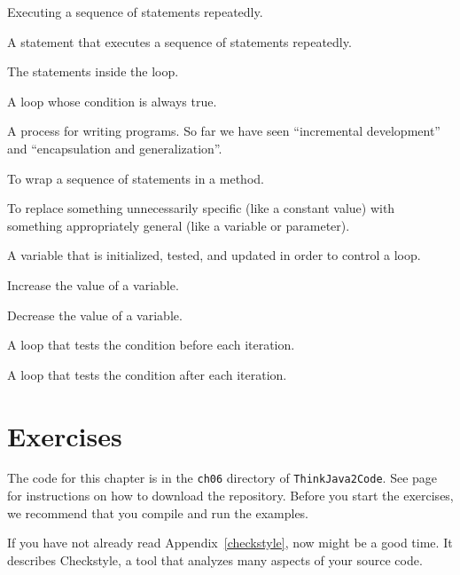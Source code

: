 \begin{description}

Executing a sequence of statements repeatedly.

A statement that executes a sequence of statements repeatedly.

The statements inside the loop.

A loop whose condition is always true.

A process for writing programs.
So far we have seen ``incremental development'' and ``encapsulation and generalization''.

To wrap a sequence of statements in a method.

To replace something unnecessarily specific (like a constant value) with something appropriately general (like a variable or parameter).

A variable that is initialized, tested, and updated in order to control a loop.

Increase the value of a variable.

Decrease the value of a variable.

A loop that tests the condition before each iteration.

A loop that tests the condition after each iteration.

\end{description}


\section{Exercises}

The code for this chapter is in the {\tt ch06} directory of {\tt ThinkJava2Code}.
See page~\pageref{code} for instructions on how to download the repository.
Before you start the exercises, we recommend that you compile and run the examples.

If you have not already read Appendix~\ref{checkstyle}, now might be a good time.
It describes Checkstyle, a tool that analyzes many aspects of your source code.


